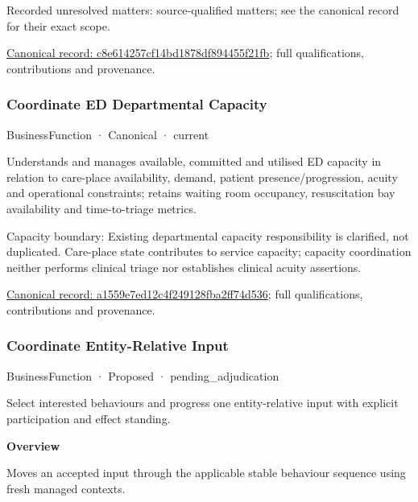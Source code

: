 {\small Recorded unresolved matters: source-qualified matters; see the canonical record for their exact scope.}\par
{\footnotesize \href{../../../../continuum/business/business-function/c8e614257cf14bd1878df894455f21fb.md}{Canonical record: c8e614257cf14bd1878df894455f21fb}; full qualifications, contributions and provenance.}\par
\subsubsection{Coordinate ED Departmental Capacity}

\label{element:a1559e7ed12c4f249128fba2ff74d536}
{\small BusinessFunction · Canonical · current}\par

Understands and manages available, committed and utilised ED capacity in relation to care-place availability, demand, patient presence/progression, acuity and operational constraints; retains waiting room occupancy, resuscitation bay availability and time-to-triage metrics.



Capacity boundary: Existing departmental capacity responsibility is clarified, not duplicated. Care-place state contributes to service capacity; capacity coordination neither performs clinical triage nor establishes clinical acuity assertions.


{\footnotesize \href{../../../../continuum/business/business-function/a1559e7ed12c4f249128fba2ff74d536.md}{Canonical record: a1559e7ed12c4f249128fba2ff74d536}; full qualifications, contributions and provenance.}\par
\subsubsection{Coordinate Entity-Relative Input}

\label{element:78417d5c46cc406f95e6a41d22e3f143}
{\small BusinessFunction · Proposed · pending\_adjudication}\par

Select interested behaviours and progress one entity-relative input with explicit participation and effect standing.



\textbf{Overview}



Moves an accepted input through the applicable stable behaviour sequence using fresh managed contexts.



